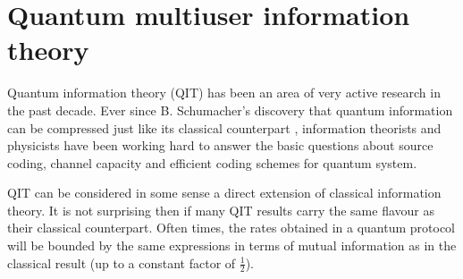 \documentclass[aps,11pt,twoside,letterpaper]{article}
\begin{document}




\section{Quantum multiuser information theory}      \label{section:quantum}

	Quantum information theory (QIT) has been an area of very active research in the past decade.
	Ever since B. Schumacher's discovery that quantum information can be compressed 
	just like its classical counterpart \cite{Sc95},
	information theorists and physicists have been working hard to answer the basic questions
	about source coding, channel capacity and efficient coding schemes for quantum system.
	
	QIT can be considered in some sense a direct extension of classical information theory.
	It is not surprising then if many QIT results carry the same flavour as their classical counterpart.
	Often times, the rates obtained in a quantum protocol will be bounded by the same expressions 
	in terms of mutual information as in the classical result (up to a constant factor of $\frac{1}{2}$).
	
\end{document}
